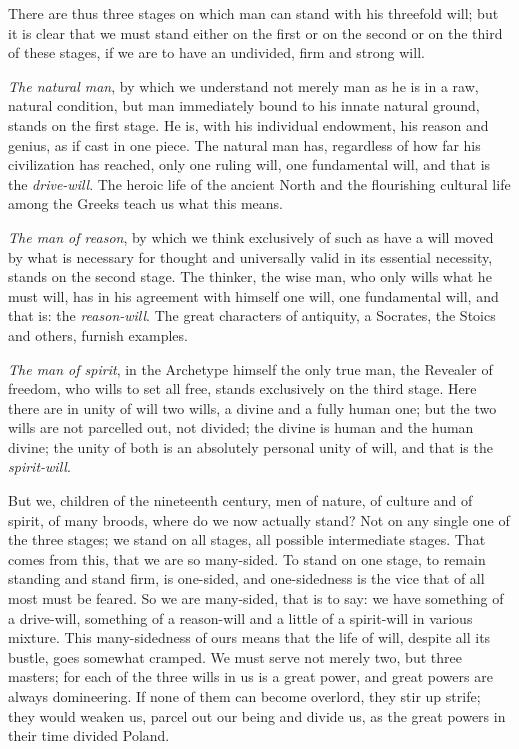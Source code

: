 \documentclass[12pt,a4paper,openany]{book}
\newcommand{\opage}[1]{\marginnote{\footnotesize\textit{[#1]}}}
\begin{document}
There are thus three stages on which man can stand
with his threefold will; but it is clear that we must stand
either on the first or on the second or on the
third of these stages, if we are to have an undivided, firm and
strong will.

\emph{The natural man}, by which we understand not merely
man as he is in a raw, natural condition, but man
immediately bound to his innate natural ground,
stands on the first stage. He is, with his individual
endowment, his reason and genius, as if cast in one piece.
The natural man has, regardless of how far his
civilization has reached, only one ruling will, one fundamental will,
and that is the \emph{drive-will}. The heroic life of the ancient North
and the flourishing cultural life among the Greeks teach us what
this means.

\emph{The man of reason}, by which we think exclusively
of such as have a will moved by what is necessary for thought
and universally valid in its essential necessity,
stands on the second stage. The thinker, the wise man, who only
wills what he must will, has in his agreement with
himself one will, one fundamental will, and that is: the \emph{reason-will}.
The great characters of antiquity, a Socrates, the Stoics
and others, furnish examples.

\emph{The man of spirit}, in the Archetype himself the only
true man, the Revealer of freedom, who wills to set all free,
stands exclusively on the third stage. Here there are in unity of will
two wills, a divine and a fully
\setcounter{footnote}{0}%
\opage{16}human one; but the two wills are not parcelled out, not
divided; the divine is human and the
human divine; the unity of both is an absolutely
personal unity of will, and that is the \emph{spirit-will}.

But we, children of the nineteenth century, men of nature, of culture and
of spirit, of many broods, where do we now
actually stand? Not on any single one of the three stages; we stand
on all stages, all possible intermediate stages. That comes from this, that
we are so many-sided. To stand on one stage, to remain standing
and stand firm, is one-sided, and one-sidedness is the vice
that of all most must be feared. So we are many-sided, that
is to say: we have something of a drive-will, something of a reason-will
and a little of a spirit-will in various mixture.
This many-sidedness of ours means that the life of will, despite all its
bustle, goes somewhat cramped. We must serve not merely two,
but three masters; for each of the three wills in us is a
great power, and great powers are always domineering. If none
of them can become overlord, they stir up strife; they would weaken
us, parcel out our being and divide us, as the great powers in
their time divided Poland.
\end{document}
